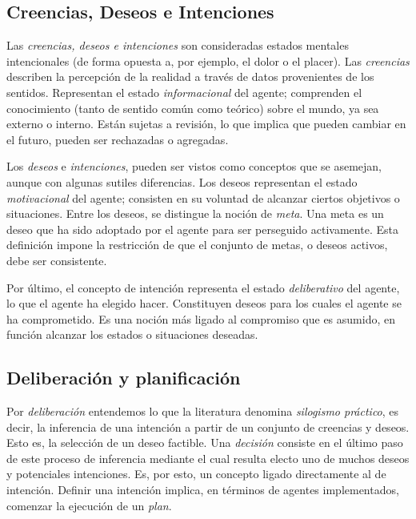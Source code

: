 \subsection{Creencias, Deseos e Intenciones}
 \label{sub:creencia_deseos_intenciones}
 
 Las \textit{creencias, deseos e intenciones} son consideradas estados
 mentales  intencionales (de forma opuesta a, por ejemplo, el dolor o
 el placer).
 Las \textit{creencias}  describen la percepción de la realidad a
 través de datos provenientes de  los sentidos.
 Representan el estado \textit{informacional} del agente; comprenden el
 conocimiento (tanto de sentido común como teórico) sobre el mundo, ya
 sea  externo o interno.
 Están sujetas a revisión, lo que implica que pueden  cambiar en el
 futuro, pueden ser rechazadas o agregadas.
 
 Los \textit{deseos} e \textit{intenciones}, pueden ser vistos como
 conceptos que  se asemejan, aunque con algunas sutiles diferencias.
 Los deseos representan el  estado \textit{motivacional} del agente;
 consisten en su voluntad de alcanzar  ciertos objetivos o situaciones.
 Entre los deseos, se distingue la noción de  \textit{meta}.
 Una meta es un deseo que ha sido adoptado por el agente para  ser
 perseguido activamente.
 Esta definición impone la restricción de que el  conjunto de metas, o
 deseos activos, debe ser consistente.
 
 Por último, el concepto de intención representa el estado
 \textit{deliberativo} del agente, lo que el agente ha elegido hacer.
 Constituyen deseos para los cuales el agente se ha comprometido.
 Es una noción más ligado al compromiso que es  asumido, en función
 alcanzar los estados o situaciones deseadas.

\subsection{Deliberación y planificación}
 \label{sub:deliberacion_planificacion}
 
 Por \textit{deliberación} entendemos lo que la literatura denomina
 \textit{silogismo práctico}, es decir, la inferencia de una intención
 a partir de un conjunto de creencias y deseos.
 Esto es, la selección de un deseo factible.
 Una \textit{decisión}  consiste en el último paso de este proceso de
 inferencia mediante el cual  resulta electo uno de muchos deseos y
 potenciales intenciones.
 Es, por esto, un concepto ligado directamente al de intención.
 Definir una intención implica, en  términos de agentes implementados,
 comenzar la ejecución de un \textit{plan}.
 
